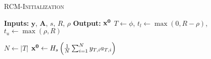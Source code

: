 \begin{algorithm}[t]
	\caption{\textsc{RCM-Initialization}}
	\label{alg:RCM}
	\begin{algorithmic}
		\State\textbf{Inputs:} $\mathbf{y}$, $\mathbf{A}$, $s$, $R$, $\rho$
		\State\textbf{Output:}  $\mathbf{x^0}$
		\State $T \leftarrow \phi$, $t_l \leftarrow \max(0, R-\rho)$, $t_u \leftarrow \max(\rho, R)$
		
		\EndIf	
		\EndFor
		\State $N \leftarrow |T|$
		\State $\mathbf{x^0} \leftarrow H_s\left( \frac{1}{N}\sum_{i=1}^{N}y_{T,i}a_{T,i}\right)$
	\end{algorithmic}
\end{algorithm}




